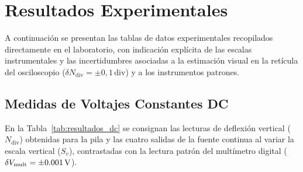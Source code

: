 
\section{Resultados Experimentales}
\label{sec:resultados}

A continuación se presentan las tablas de datos experimentales recopilados directamente en el laboratorio, con indicación explícita de las escalas instrumentales y las incertidumbres asociadas a la estimación visual en la retícula del osciloscopio ($\delta N_{\text{div}} = \pm 0{,}1\,\text{div}$) y a los instrumentos patrones.

\subsection{Medidas de Voltajes Constantes DC}
En la Tabla~\ref{tab:resultados_dc} se consignan las lecturas de deflexión vertical ($N_{\text{div}}$) obtenidas para la pila y las cuatro salidas de la fuente continua al variar la escala vertical ($S_v$), contrastadas con la lectura patrón del multímetro digital ($\delta V_{\text{mult}} = \qty{\pm 0,001}{\volt}$).

